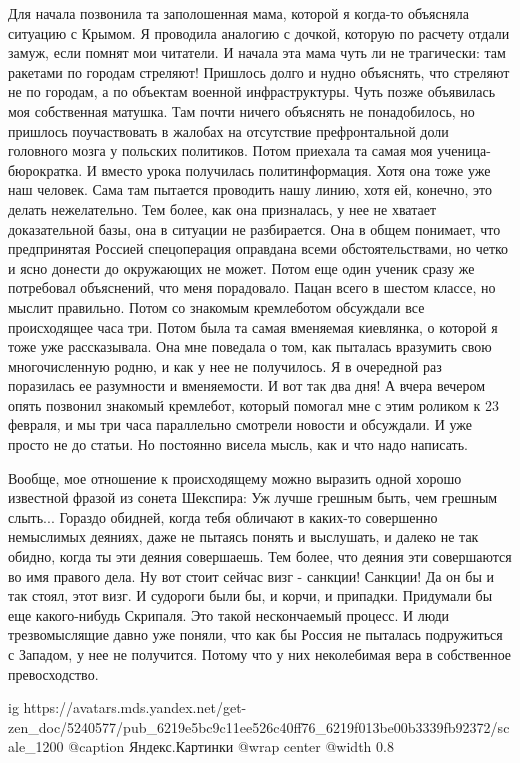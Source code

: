 Для начала позвонила та заполошенная мама, которой я когда-то объясняла
ситуацию с Крымом. Я проводила аналогию с дочкой, которую по расчету отдали
замуж, если помнят мои читатели. И начала эта мама чуть ли не трагически: там
ракетами по городам стреляют! Пришлось долго и нудно объяснять, что стреляют не
по городам, а по объектам военной инфраструктуры. Чуть позже объявилась моя
собственная матушка. Там почти ничего объяснять не понадобилось, но пришлось
поучаствовать в жалобах на отсутствие префронтальной доли головного мозга у
польских политиков. Потом приехала та самая моя ученица-бюрократка. И вместо
урока получилась политинформация. Хотя она тоже уже наш человек. Сама там
пытается проводить нашу линию, хотя ей, конечно, это делать нежелательно. Тем
более, как она призналась, у нее не хватает доказательной базы, она в ситуации
не разбирается. Она в общем понимает, что предпринятая Россией спецоперация
оправдана всеми обстоятельствами, но четко и ясно донести до окружающих не
может. Потом еще один ученик сразу же потребовал объяснений, что меня
порадовало. Пацан всего в шестом классе, но мыслит правильно. Потом со знакомым
кремлеботом обсуждали все происходящее часа три. Потом была та самая вменяемая
киевлянка, о которой я тоже уже рассказывала. Она мне поведала о том, как
пыталась вразумить свою многочисленную родню, и как у нее не получилось. Я в
очередной раз поразилась ее разумности и вменяемости. И вот так два дня! А
вчера вечером опять позвонил знакомый кремлебот, который помогал мне с этим
роликом к 23 февраля, и мы три часа параллельно смотрели новости и обсуждали. И
уже просто не до статьи. Но постоянно висела мысль, как и что надо написать.

Вообще, мое отношение к происходящему можно выразить одной хорошо известной
фразой из сонета Шекспира: Уж лучше грешным быть, чем грешным слыть... Гораздо
обидней, когда тебя обличают в каких-то совершенно немыслимых деяниях, даже не
пытаясь понять и выслушать, и далеко не так обидно, когда ты эти деяния
совершаешь. Тем более, что деяния эти совершаются во имя правого дела. Ну вот
стоит сейчас визг - санкции! Санкции! Да он бы и так стоял, этот визг. И
судороги были бы, и корчи, и припадки. Придумали бы еще какого-нибудь Скрипаля.
Это такой нескончаемый процесс. И люди трезвомыслящие давно уже поняли, что как
бы Россия не пыталась подружиться с Западом, у нее не получится. Потому что у
них неколебимая вера в собственное превосходство. 

\ifcmt
  ig https://avatars.mds.yandex.net/get-zen_doc/5240577/pub_6219e5bc9c11ee526c40ff76_6219f013be00b3339fb92372/scale_1200
	@caption Яндекс.Картинки
  @wrap center
  @width 0.8
\fi

